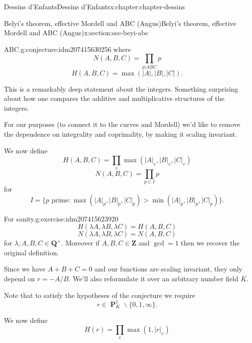 \documentclass[oneside,10pt,]{book}
\numberwithin{equation}{section}
\newcommand{\units}{^{\times}}
\newcommand{\ZZ}{\mathbf{Z}}
\newcommand{\QQ}{\mathbf{Q}}
\DeclareMathOperator{\PP}{\mathbf{P}}
\newcommand{\gt}{>}
\begin{document}
\begin{chapterptx}{Dessins d'Enfants}{}{Dessins d'Enfants}{}{}{x:chapter:chapter-dessins}
\begin{sectionptx}{Belyi's theorem, effective Mordell and ABC (Angus)}{}{Belyi's theorem, effective Mordell and ABC (Angus)}{}{}{x:section:sec-beyi-abc}
\begin{conjecture}{ABC.}{}{g:conjecture:idm207415630256}
where%
\begin{equation*}
N(A,B,C) =  \prod_{p|ABC} p
\end{equation*}
%
\begin{equation*}
H(A,B,C) = \max(|A|,|B|,|C|)\text{.}
\end{equation*}
%
\end{conjecture}
This is a remarkably deep statement about the integers. Something surprising about how one compares the additive and multiplicative structures of the integers.%
\par
For our purposes (to connect it to the curves and Mordell) we'd like to remove the dependence on integrality and coprimality, by making it scaling invariant.%
\par
We now define%
\begin{equation*}
H(A,B,C) = \prod_{v}\max(|A|_v,|B|_v,|C|_v)
\end{equation*}
%
\begin{equation*}
N(A,B,C) =  \prod_{p\in I} p
\end{equation*}
for%
\begin{equation*}
I = \{p \text{ prime} : \max(|A|_p,|B|_p,|C|_p) \gt \min(|A|_p,|B|_p,|C|_p)\}\text{.}
\end{equation*}
%
\begin{inlineexercise}{For sanity.}{g:exercise:idm207415623920}%
%
\begin{equation*}
H(\lambda A,\lambda B,\lambda C)  = H(A,B,C)
\end{equation*}
%
\begin{equation*}
N(\lambda A,\lambda B,\lambda C)  = N(A,B,C)
\end{equation*}
for \(\lambda, A,B,C \in \QQ\units\). Moreover if \(A,B,C \in \ZZ\) and \(\gcd = 1\) then we recover the original definition.%
\end{inlineexercise}
Since we have \(A+ B+C = 0\) and our functions are scaling invariant, they only depend on \(r=  - A/B\). We'll also reformulate it over an arbitrary number field \(K\).%
\par
Note that to satisfy the hypotheses of the conjecture we require%
\begin{equation*}
r \in \PP^1_K \smallsetminus \{0,1,\infty\}\text{.}
\end{equation*}
%
\par
We now define%
\begin{equation*}
H(r) = \prod_{v}\max(1,|r|_v)
\end{equation*}
%
\begin{equation*}

\end{equation*}
\end{sectionptx}
\end{chapterptx}
\end{document}
